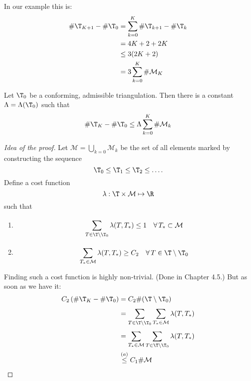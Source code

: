 \begin{enumerate}[label = \alph*)]
    In our example this is:
		\begin{align*}
			\# \T_{K+1} - \# \T_{0} &= \sum\limits_{k=0}^{K} \# \T_{k+1} - \# \T_{k}\\
									&= 4K + 2 + 2K\\
									&\leq 3( 2K +2 )\\
									&= 3 \sum\limits_{k=0}^{K} \#\mathcal{M}_{K} 
		\end{align*}
		\begin{theorem}
			Let $\T_{0}$ be a conforming, admissible triangulation. Then there is a constant $\Lambda = \Lambda(\T_{0})$ such that 
			\begin{equation*}
				\# \T_{K} - \# \T_{0} \leq \Lambda \sum\limits_{k=0}^{K} \#\mathcal{M}_{k}
			\end{equation*}
		\end{theorem}
    \begin{proof}[Idea of the proof]
			Let $\mathcal{M} = \bigcup_{k=0} \mathcal{M}_{k}$ be the set of all elements marked by constructing the sequence
			 \begin{equation*}
				\T_{0} \leq \T_{1} \leq \T_{2}\leq \dots .
			\end{equation*}
			Define a cost function
			\begin{equation*}
				\lambda: \T \times \mathcal{M} \mapsto \R
			\end{equation*}
			such that
			\begin{enumerate}[label = \alph*)]
				\item 
					\begin{equation*}
						\sum\limits_{T \in \T\setminus \T_{0}}^{} \lambda(T,T_{*}) \leq 1 \quad \forall \, T_{*} \subset \mathcal{M}
					\end{equation*}
				\item 
					\begin{equation*}
						\sum\limits_{T_{*}\in \mathcal{M}}^{} \lambda(T,T_{*}) \geq C_{2} \quad \forall \, T \in \T \setminus \T_{0}
					\end{equation*}
			\end{enumerate}
      Finding such a cost function is highly non-trivial. (Done in Chapter 4.5.) %
      But as soon as we have it:
			\begin{align*}
				C_{2} \left( \# \T_{K} - \# \T_{0} \right) &= C_{2}\# (\T\setminus \T_{0}) \\
														   &= \sum\limits_{T \in \T \setminus \T_{0} }^{} \sum\limits_{T_{*} \in \mathcal{M}}^{} \lambda(T,T_{*})\\
														   &= \sum\limits_{T_{*} \in \mathcal{M}}^{} \sum\limits_{T \in \T \setminus \T_{0} }^{} \lambda(T,T_{*})\\
														   &\overset{(a)}{\leq} C_{1} \# \mathcal{M}
			\end{align*}
		\end{proof}
\end{enumerate}

